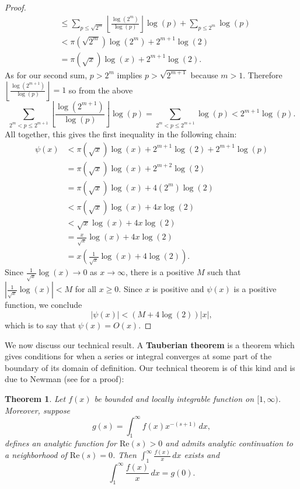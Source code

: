 \documentclass[12pt]{book}
\newtheorem{theorem}{Theorem}[section]
\theoremstyle{definition}\newframedtheorem{method}{Method}
\newcommand{\<}{\langle}
\renewcommand{\>}{\rangle}
\renewcommand{\Re}{\mathrm{Re}}
\begin{document}
\begin{proof}
\begin{align*}
          &\le \sum_{p \le \sqrt{2^{m}}}\left\lfloor\frac{\log(2^{m})}{\log(p)}\right\rfloor\log(p)+\sum_{p \le 2^{m}}\log(p) \\
          &< \pi(\sqrt{2^{m}})\log(2^{m})+2^{m+1}\log(2) \\
          &= \pi(\sqrt{x})\log(x)+2^{m+1}\log(2).
        \end{align*}
        As for our second sum, $p > 2^{m}$ implies $p > \sqrt{2^{m+1}}$ because $m > 1$. Therefore $\left\lfloor\frac{\log(2^{m+1})}{\log(p)}\right\rfloor = 1$ so from the above
        \[
          \sum_{2^{m} < p \le 2^{m+1}}\left\lfloor\frac{\log(2^{m+1})}{\log(p)}\right\rfloor\log(p) = \sum_{2^{m} < p \le 2^{m+1}}\log(p) < 2^{m+1}\log(p).
        \]
        All together, this gives the first inequality in the following chain:
        \begin{align*}
          \psi(x) &< \pi(\sqrt{x})\log(x)+2^{m+1}\log(2)+2^{m+1}\log(p) \\
          &= \pi(\sqrt{x})\log(x)+2^{m+2}\log(2) \\
          &= \pi(\sqrt{x})\log(x)+4(2^{m})\log(2) \\
          &< \pi(\sqrt{x})\log(x)+4x\log(2) \\
          &< \sqrt{x}\log(x)+4x\log(2) \\
          &= \frac{x}{\sqrt{x}}\log(x)+4x\log(2) \\
          &= x\left(\frac{1}{\sqrt{x}}\log(x)+4\log(2)\right).
        \end{align*}
        Since $\frac{1}{\sqrt{x}}\log(x) \to 0$ as $x \to \infty$, there is a positive $M$ such that $\left|\frac{1}{\sqrt{x}}\log(x)\right| < M$ for all $x \ge 0$. Since $x$ is positive and $\psi(x)$ is a positive function, we conclude
        \[
          \left|\psi(x)\right| < (M+4\log(2))|x|,
        \]
        which is to say that $\psi(x) = O(x)$.
      \end{proof}

      We now discuss our technical result. A \textbf{Tauberian theorem} is a theorem which gives conditions for when a series or integral converges at some part of the boundary of its domain of definition. Our technical theorem is of this kind and is due to Newman (see \cite{vatwani2015simple} for a proof):

      \begin{theorem}\label{thm:Tauberian_theorem_for_the_prime_number_theorem}
        Let $f(x)$ be bounded and locally integrable function on $[1,\infty)$. Moreover, suppose
        \[
          g(s) = \int_{1}^{\infty}f(x)x^{-(s+1)}\,dx,
        \]
        defines an analytic function for $\Re(s) > 0$ and admits analytic continuation to a neighborhood of $\Re(s) = 0$. Then $\int_{1}^{\infty}\frac{f(x)}{x}\,dx$ exists and
        \[
          \int_{1}^{\infty}\frac{f(x)}{x}\,dx = g(0).
        \]
      \end{theorem}
\end{document}
